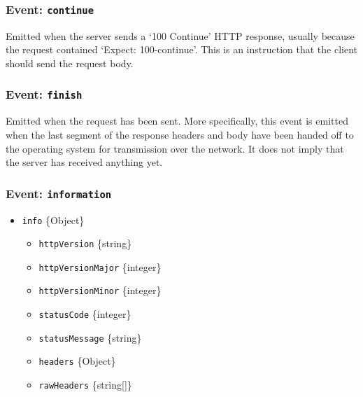 \subsubsection{\texorpdfstring{Event:
\texttt{\textquotesingle{}continue\textquotesingle{}}}{Event: \textquotesingle continue\textquotesingle{}}}\label{event-continue}

Emitted when the server sends a `100 Continue' HTTP response, usually
because the request contained `Expect: 100-continue'. This is an
instruction that the client should send the request body.

\subsubsection{\texorpdfstring{Event:
\texttt{\textquotesingle{}finish\textquotesingle{}}}{Event: \textquotesingle finish\textquotesingle{}}}\label{event-finish}

Emitted when the request has been sent. More specifically, this event is
emitted when the last segment of the response headers and body have been
handed off to the operating system for transmission over the network. It
does not imply that the server has received anything yet.

\subsubsection{\texorpdfstring{Event:
\texttt{\textquotesingle{}information\textquotesingle{}}}{Event: \textquotesingle information\textquotesingle{}}}\label{event-information}

\begin{itemize}
\tightlist
\item
  \texttt{info} \{Object\}

  \begin{itemize}
  \tightlist
  \item
    \texttt{httpVersion} \{string\}
  \item
    \texttt{httpVersionMajor} \{integer\}
  \item
    \texttt{httpVersionMinor} \{integer\}
  \item
    \texttt{statusCode} \{integer\}
  \item
    \texttt{statusMessage} \{string\}
  \item
    \texttt{headers} \{Object\}
  \item
    \texttt{rawHeaders} \{string{[}{]}\}
  \end{itemize}
\end{itemize}

